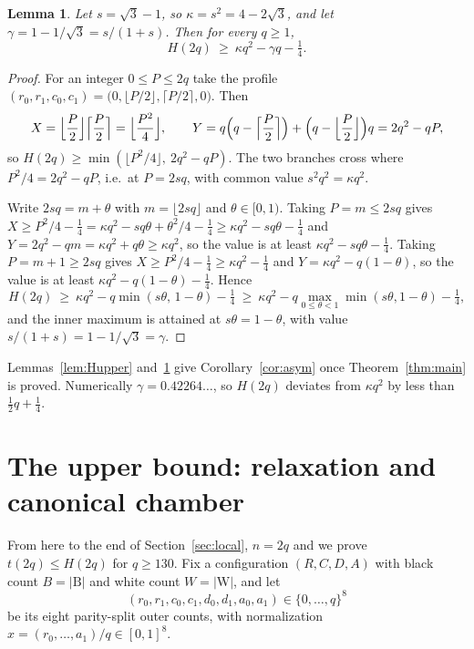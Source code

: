 \documentclass[11pt]{amsart}
\newtheorem{lemma}[theorem]{Lemma}
\theoremstyle{definition}
\theoremstyle{remark}
\newcommand{\Bl}{\mathrm{B}}
\newcommand{\Wh}{\mathrm{W}}
\begin{document}
\begin{lemma}\label{lem:Hlower}
Let $s=\sqrt3-1$, so $\kappa=s^2=4-2\sqrt3$, and let $\gamma=1-1/\sqrt3=s/(1+s)$. Then for every $q\ge1$,
\[
H(2q)\ \ge\ \kappa q^2-\gamma q-\tfrac14 .
\]
\end{lemma}

\begin{proof}
For an integer $0\le P\le2q$ take the profile $(r_0,r_1,c_0,c_1)=\bigl(0,\lfloor P/2\rfloor,\lceil P/2\rceil,0\bigr)$. Then
\[
X=\Bigl\lfloor\frac{P}{2}\Bigr\rfloor\Bigl\lceil\frac{P}{2}\Bigr\rceil=\Bigl\lfloor\frac{P^2}{4}\Bigr\rfloor,
\qquad
Y=q\Bigl(q-\Bigl\lceil\frac P2\Bigr\rceil\Bigr)+\Bigl(q-\Bigl\lfloor\frac P2\Bigr\rfloor\Bigr)q=2q^2-qP,
\]
so $H(2q)\ge\min(\lfloor P^2/4\rfloor,\ 2q^2-qP)$. The two branches cross where $P^2/4=2q^2-qP$, i.e.\ at $P=2sq$, with common value $s^2q^2=\kappa q^2$.

Write $2sq=m+\theta$ with $m=\lfloor2sq\rfloor$ and $\theta\in[0,1)$. Taking $P=m\le2sq$ gives $X\ge P^2/4-\frac14=\kappa q^2-sq\theta+\theta^2/4-\frac14\ge\kappa q^2-sq\theta-\frac14$ and $Y=2q^2-qm=\kappa q^2+q\theta\ge\kappa q^2$, so the value is at least $\kappa q^2-sq\theta-\frac14$. Taking $P=m+1\ge2sq$ gives $X\ge P^2/4-\frac14\ge\kappa q^2-\frac14$ and $Y=\kappa q^2-q(1-\theta)$, so the value is at least $\kappa q^2-q(1-\theta)-\frac14$. Hence
\[
H(2q)\ \ge\ \kappa q^2-q\min(s\theta,\,1-\theta)-\tfrac14\ \ge\ \kappa q^2-q\max_{0\le\theta<1}\min(s\theta,1-\theta)-\tfrac14 ,
\]
and the inner maximum is attained at $s\theta=1-\theta$, with value $s/(1+s)=1-1/\sqrt3=\gamma$.
\end{proof}

Lemmas~\ref{lem:Hupper} and~\ref{lem:Hlower} give Corollary~\ref{cor:asym} once Theorem~\ref{thm:main} is proved. Numerically $\gamma=0.42264\ldots$, so $H(2q)$ deviates from $\kappa q^2$ by less than $\tfrac12 q+\tfrac14$.

\section{The upper bound: relaxation and canonical chamber}\label{sec:relax}

From here to the end of Section~\ref{sec:local}, $n=2q$ and we prove $t(2q)\le H(2q)$ for $q\ge130$. Fix a configuration $(R,C,D,A)$ with black count $B=|\Bl|$ and white count $W=|\Wh|$, and let
\[
(r_0,r_1,c_0,c_1,d_0,d_1,a_0,a_1)\in\{0,\dots,q\}^8
\]
be its eight parity-split outer counts, with normalization $x=(r_0,\dots,a_1)/q\in[0,1]^8$.
\end{document}
